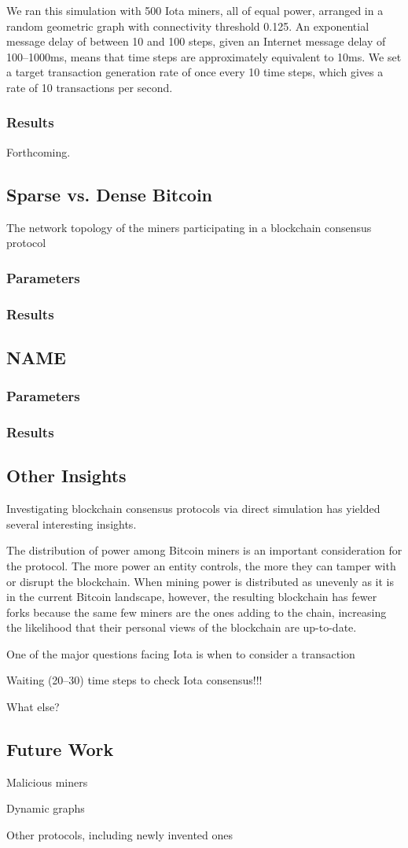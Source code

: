 \documentclass[letterpaper,11pt]{article}
\begin{document}
We ran this simulation with 500 Iota miners, all of equal power, arranged in a random geometric graph with connectivity threshold 0.125. An exponential message delay of between 10 and 100 steps, given an Internet message delay of 100--1000ms, means that time steps are approximately equivalent to 10ms. We set a target transaction generation rate of once every 10 time steps, which gives a rate of 10 transactions per second.

\subsubsection{Results}
Forthcoming.

\subsection{Sparse vs. Dense Bitcoin}
The network topology of the miners participating in a blockchain consensus protocol 

\subsubsection{Parameters}

\subsubsection{Results}

\subsection{NAME}

\subsubsection{Parameters}

\subsubsection{Results}


\subsection{Other Insights}

Investigating blockchain consensus protocols via direct simulation has yielded several interesting insights.

The distribution of power among Bitcoin miners is an important consideration for the protocol. The more power an entity controls, the more they can tamper with or disrupt the blockchain. When mining power is distributed as unevenly as it is in the current Bitcoin landscape, however, the resulting blockchain has fewer forks because the same few miners are the ones adding to the chain, increasing the likelihood that their personal views of the blockchain are up-to-date.

One of the major questions facing Iota is when to consider a transaction

Waiting (20--30) time steps to check Iota consensus!!!

What else?

\subsection{Future Work}
Malicious miners

Dynamic graphs

Other protocols, including newly invented ones
\end{document}
